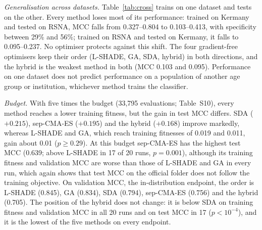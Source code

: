 \documentclass[preprint,12pt]{elsarticle}
\begin{document}
\emph{Generalisation across datasets.} Table~\ref{tab:cross} trains on one dataset and tests on the other. Every method loses most of its performance: trained on Kermany and tested on RSNA, MCC falls from 0.327--0.804 to 0.103--0.413, with specificity between 29\% and 56\%; trained on RSNA and tested on Kermany, it falls to 0.095--0.237. No optimiser protects against this shift. The four gradient-free optimisers keep their order (L-SHADE, GA, SDA, hybrid) in both directions, and the hybrid is the weakest method in both (MCC 0.103 and 0.095). Performance on one dataset does not predict performance on a population of another age group or institution, whichever method trains the classifier.

\emph{Budget.} With five times the budget (33,795 evaluations; Table~S10), every method reaches a lower training fitness, but the gain in test MCC differs. SDA ($+0.215$), sep-CMA-ES ($+0.195$) and the hybrid ($+0.168$) improve markedly, whereas L-SHADE and GA, which reach training fitnesses of 0.019 and 0.011, gain about 0.01 ($p\ge 0.29$). At this budget sep-CMA-ES has the highest test MCC (0.639; above L-SHADE in 17 of 20 runs, $p=0.001$), although its training fitness and validation MCC are worse than those of L-SHADE and GA in every run, which again shows that test MCC on the official folder does not follow the training objective. On validation MCC, the in-distribution endpoint, the order is L-SHADE (0.845), GA (0.834), SDA (0.794), sep-CMA-ES (0.756) and the hybrid (0.705). The position of the hybrid does not change: it is below SDA on training fitness and validation MCC in all 20 runs and on test MCC in 17 ($p<10^{-4}$), and it is the lowest of the five methods on every endpoint.




\end{document}
